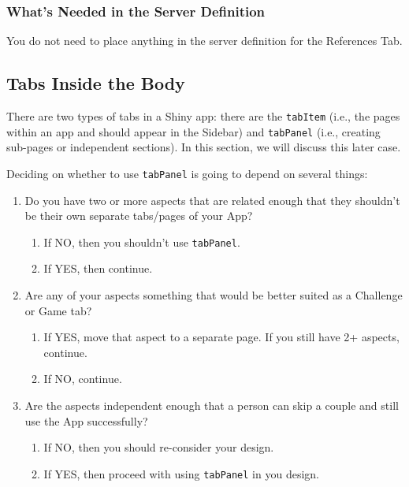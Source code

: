 \documentclass[
]{book}
\providecommand{\tightlist}{%
  \setlength{\itemsep}{0pt}\setlength{\parskip}{0pt}}
\begin{document}
\hypertarget{whats-needed-in-the-server-definition-3}{%
\subsubsection{What's Needed in the Server Definition}\label{whats-needed-in-the-server-definition-3}}

You do not need to place anything in the server definition for the References Tab.

\hypertarget{innerTabs}{%
\subsection{Tabs Inside the Body}\label{innerTabs}}

There are two types of tabs in a Shiny app: there are the \texttt{tabItem} (i.e., the pages within an app and should appear in the Sidebar) and \texttt{tabPanel} (i.e., creating sub-pages or independent sections). In this section, we will discuss this later case.

Deciding on whether to use \texttt{tabPanel} is going to depend on several things:

\begin{enumerate}
\def\labelenumi{\arabic{enumi}.}
\tightlist
\item
  Do you have two or more aspects that are related enough that they shouldn't be their own separate tabs/pages of your App?

  \begin{enumerate}
  \def\labelenumii{\alph{enumii}.}
  \tightlist
  \item
    If NO, then you shouldn't use \texttt{tabPanel}.\\
  \item
    If YES, then continue.
  \end{enumerate}
\item
  Are any of your aspects something that would be better suited as a Challenge or Game tab?

  \begin{enumerate}
  \def\labelenumii{\alph{enumii}.}
  \tightlist
  \item
    If YES, move that aspect to a separate page. If you still have 2+ aspects, continue.\\
  \item
    If NO, continue.\\
  \end{enumerate}
\item
  Are the aspects independent enough that a person can skip a couple and still use the App successfully?

  \begin{enumerate}
  \def\labelenumii{\alph{enumii}.}
  \tightlist
  \item
    If NO, then you should re-consider your design.\\
  \item
    If YES, then proceed with using \texttt{tabPanel} in you design.
  \end{enumerate}
\end{enumerate}
\end{document}
